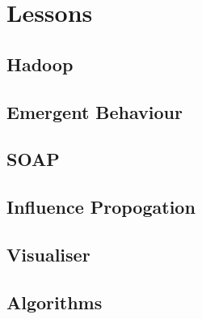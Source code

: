 \section{Lessons}


\subsection{Hadoop}

\subsection{Emergent Behaviour}

\subsection{SOAP}

\subsection{Influence Propogation}

\subsection{Visualiser}

\subsection{Algorithms}

